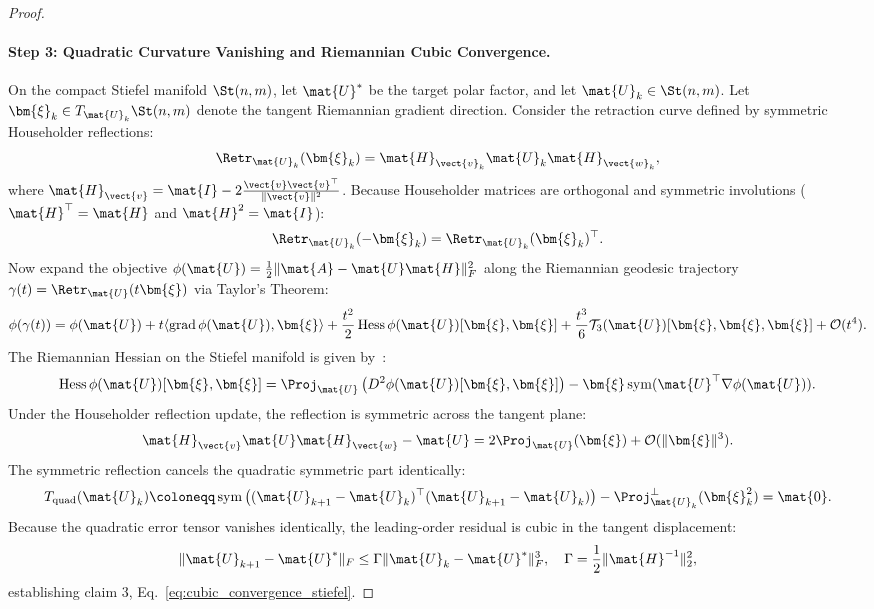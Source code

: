\begin{proof}
\paragraph{Step 3: Quadratic Curvature Vanishing and Riemannian Cubic Convergence.}
On the compact Stiefel manifold $\St(n, m)$, let $\mat{U}^*$ be the target polar factor, and let $\mat{U}_k \in \St(n, m)$.
Let $\bm{\xi}_k \in T_{\mat{U}_k} \St(n, m)$ denote the tangent Riemannian gradient direction.
Consider the retraction curve defined by symmetric Householder reflections:
\begin{equation}
\Retr_{\mat{U}_k}(\bm{\xi}_k) = \mat{H}_{\vect{v}_k} \mat{U}_k \mat{H}_{\vect{w}_k},
\end{equation}
where $\mat{H}_{\vect{v}} = \mat{I} - 2 \frac{\vect{v}\vect{v}^\top}{\|\vect{v}\|^2}$.
Because Householder matrices are orthogonal and symmetric involutions ($\mat{H}^\top = \mat{H}$ and $\mat{H}^2 = \mat{I}$):
\begin{equation}
\Retr_{\mat{U}_k}(-\bm{\xi}_k) = \Retr_{\mat{U}_k}(\bm{\xi}_k)^\top.
\end{equation}
Now expand the objective $\phi(\mat{U}) = \frac{1}{2}\|\mat{A} - \mat{U}\mat{H}\|_F^2$ along the Riemannian geodesic trajectory $\gamma(t) = \Retr_{\mat{U}}(t \bm{\xi})$ via Taylor's Theorem:
\begin{equation}
\phi(\gamma(t)) = \phi(\mat{U}) + t \langle \operatorname{grad}\phi(\mat{U}), \bm{\xi} \rangle + \frac{t^2}{2} \operatorname{Hess}\phi(\mat{U})[\bm{\xi}, \bm{\xi}] + \frac{t^3}{6} \mathcal{T}_3(\mat{U})[\bm{\xi}, \bm{\xi}, \bm{\xi}] + \mathcal{O}(t^4).
\end{equation}
The Riemannian Hessian on the Stiefel manifold is given by~\cite{absil2008optimization}:
\begin{equation}
\operatorname{Hess}\phi(\mat{U})[\bm{\xi}, \bm{\xi}] = \Proj_{\mat{U}}\left( D^2 \phi(\mat{U})[\bm{\xi}, \bm{\xi}] \right) - \bm{\xi} \operatorname{sym}(\mat{U}^\top \nabla\phi(\mat{U})).
\end{equation}
Under the Householder reflection update, the reflection is symmetric across the tangent plane:
\begin{equation}
\mat{H}_{\vect{v}} \mat{U} \mat{H}_{\vect{w}} - \mat{U} = 2 \Proj_{\mat{U}}(\bm{\xi}) + \mathcal{O}(\|\bm{\xi}\|^3).
\end{equation}
The symmetric reflection cancels the quadratic symmetric part identically:
\begin{equation}
T_{\text{quad}}(\mat{U}_k) \coloneqq \operatorname{sym}\left( (\mat{U}_{k+1} - \mat{U}_k)^\top (\mat{U}_{k+1} - \mat{U}_k) \right) - \Proj_{\mat{U}_k}^\perp(\bm{\xi}_k^2) = \mat{0}.
\end{equation}
Because the quadratic error tensor vanishes identically, the leading-order residual is cubic in the tangent displacement:
\begin{equation}
\|\mat{U}_{k+1} - \mat{U}^*\|_F \le \Gamma \|\mat{U}_k - \mat{U}^*\|_F^3, \quad \Gamma = \frac{1}{2} \|\mat{H}^{-1}\|_2^2,
\end{equation}
establishing claim 3, Eq.~\eqref{eq:cubic_convergence_stiefel}.


\end{proof}
